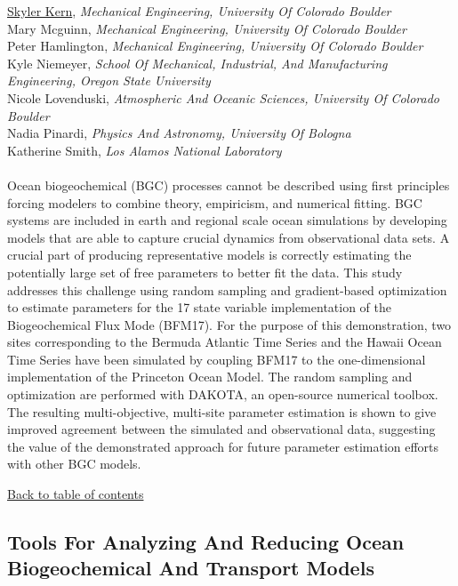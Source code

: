 \underline{Skyler Kern}, \textit{Mechanical Engineering, University Of Colorado Boulder}\\ 
{Mary Mcguinn}, \textit{Mechanical Engineering, University Of Colorado Boulder}\\ 
{Peter Hamlington}, \textit{Mechanical Engineering, University Of Colorado Boulder}\\ 
{Kyle Niemeyer}, \textit{School Of Mechanical, Industrial, And Manufacturing Engineering, Oregon State University}\\ 
{Nicole Lovenduski}, \textit{Atmospheric And Oceanic Sciences, University Of Colorado Boulder}\\ 
{Nadia Pinardi}, \textit{Physics And Astronomy, University Of Bologna}\\ 
{Katherine Smith}, \textit{Los Alamos National Laboratory}\\ 
\vspace{-0.1 in} \\ 
\noindent Ocean biogeochemical (BGC) processes cannot be described using first principles forcing modelers to combine theory, empiricism, and numerical fitting. BGC systems are included in earth and regional scale ocean simulations by developing models that are able to capture crucial dynamics from observational data sets. A crucial part of producing representative models is correctly estimating the potentially large set of free parameters to better fit the data. This study addresses this challenge using random sampling and gradient-based optimization to estimate parameters for the 17 state variable implementation of the Biogeochemical Flux Mode (BFM17). For the purpose of this demonstration, two sites corresponding to the Bermuda Atlantic Time Series and the Hawaii Ocean Time Series have been simulated by coupling BFM17 to the one-dimensional implementation of the Princeton Ocean Model. The random sampling and optimization are performed with DAKOTA, an open-source numerical toolbox. The resulting multi-objective, multi-site parameter estimation is shown to give improved agreement between the simulated and observational data, suggesting the value of the demonstrated approach for future parameter estimation efforts with other BGC models.  \\ 
\begin{flushright}\vspace{-0.2 in}\hyperlink{toc}{Back to table of contents}\end{flushright}\vspace{-0.2 in}
\hypertarget{MalikJordan}{\subsection*{\color{CUGOLD} Tools For Analyzing And Reducing Ocean Biogeochemical And Transport Models}} \vsp 
